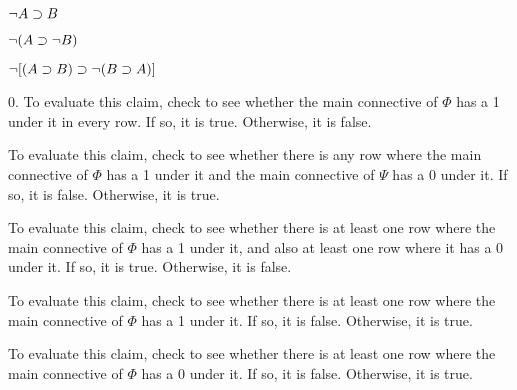\begin{earg}
\item %
$\neg A \supset B$
\item %
$\neg(A \supset \neg B)$
\item %
$\neg [(A\supset B) \supset \neg(B\supset A)]$
\end{earg}


\begin{earg}
\item[0.] To evaluate this claim, check to see whether the main connective of $\Phi$ has a 1 under it in every row. If so, it is true. Otherwise, it is false.
\item To evaluate this claim, check to see whether there is any row where the main connective of $\Phi$ has a 1 under it and the main connective of $\Psi$ has a 0 under it. If so, it is false. Otherwise, it is true.
\item To evaluate this claim, check to see whether there is at least one row where the main connective of $\Phi$ has a 1 under it, and also at least one row where it has a 0 under it. If so, it is true. Otherwise, it is false.
\item To evaluate this claim, check to see whether there is at least one row where the main connective of $\Phi$ has a 1 under it. If so, it is false. Otherwise, it is true.
\item To evaluate this claim, check to see whether there is at least one row where the main connective of $\Phi$ has a 0 under it. If so, it is false. Otherwise, it is true.
\end{earg}


